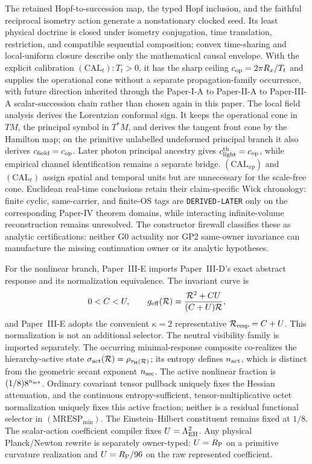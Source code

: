 \documentclass[12pt,a4paper]{article}
\begin{document}
The retained Hopf-to-succession map, the typed Hopf inclusion, and the
faithful reciprocal isometry action generate a nonstationary clocked seed.
Its least physical doctrine is closed under isometry conjugation, time
translation, restriction, and compatible sequential composition; convex
time-sharing and local-uniform closure describe only the mathematical causal
envelope.
With the explicit calibration \((\mathrm{CAL}_t):T_t>0\), it has the sharp
ceiling \(c_{\rm op}=2\pi R_x/T_t\) and supplies the operational cone
without a separate propagation-family occurrence, with
future direction inherited through the Paper-I-A to
Paper-II-A to Paper-III-A scalar-succession chain rather than chosen again in
this paper.  The local field analysis derives the Lorentzian conformal sign.
It keeps the operational cone in \(TM\), the principal symbol in \(T^*M\),
and derives the tangent front cone by the Hamilton map;
on the primitive unlabelled undeformed principal branch it also derives
\(c_{\rm field}=c_{\rm op}\).  Later photon principal ancestry gives
\(c_{\rm light}^{\rm th}=c_{\rm op}\), while empirical channel identification
remains a separate bridge.
\((\mathrm{CAL}_{xp})\) and \((\mathrm{CAL}_t)\) assign spatial and temporal
units but are unnecessary for the scale-free cone.  Euclidean real-time conclusions retain their claim-specific Wick chronology:
finite cyclic, same-carrier, and finite-OS tags are \texttt{DERIVED-LATER}
only on the corresponding Paper-IV theorem domains, while interacting
infinite-volume reconstruction remains unresolved.  The constructor
firewall classifies these as analytic certifications: neither G0 actuality nor
GP2 same-owner invariance can manufacture the missing continuation owner or
its analytic hypotheses.

For the nonlinear branch, Paper~III-E imports Paper~III-D's exact abstract
response and its normalization equivalence.  The invariant curve is
\[
 0<C<U,\qquad
 g_{\rm eff}(\mathcal R)=\frac{\mathcal R^2+CU}{(C+U)\mathcal R},
\]
and Paper~III-E adopts the convenient \(\kappa=2\) representative
\(\mathcal R_{\rm resp}=C+U\).  This normalization is not an additional
selector.  The neutral visibility family is imported separately.  The
occurring minimal-response composite co-realizes the hierarchy-active state
\(\sigma_{\rm act}(\mathcal R)=\rho_{\tau_{\rm H}(\mathcal R)}\); its entropy defines
\(n_{\rm act}\), which is distinct from the geometric secant exponent
\(n_{\rm sec}\).  The active nonlinear fraction is
\((1/8)8^{n_{\rm act}}\).  Ordinary covariant tensor pullback uniquely fixes
the Hessian attenuation, and the continuous entropy-sufficient,
tensor-multiplicative octet normalization uniquely fixes this active fraction;
neither is a residual functional selector in
\((\mathrm{MRESP}_{\min})\).  The Einstein--Hilbert constituent remains fixed
at \(1/8\).  The scalar-action coefficient compiler fixes
\(U=\Lambda_{\rm EH}^2\).  Any physical Planck/Newton rewrite is separately
owner-typed: \(U=R_{\mathrm P}\) on a primitive curvature realization and
\(U=R_{\mathrm P}/96\) on the raw represented coefficient.
\end{document}
